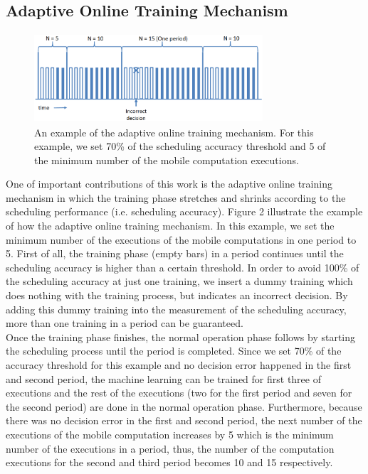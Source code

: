 \documentclass[10pt, conference, compsocconf]{IEEEtran}
\begin{document}
\subsection{Adaptive Online Training Mechanism}
%
\begin{figure}
\centering
\includegraphics[height=3.3cm, width=8.5cm]{Figure/figure2}
\caption{An example of the adaptive online training mechanism. For this
example, we set 70\% of the scheduling accuracy threshold and 5 of the
minimum number of the mobile computation executions.}
\end{figure}
%
One of important contributions of this work is the adaptive online
training mechanism in which the training phase stretches and shrinks
according to the scheduling performance (i.e. scheduling accuracy).
%
Figure 2 illustrate the example of how the adaptive online training
mechanism.
%
In this example, we set the minimum number of the executions of the
mobile computations in one period to 5.
%
First of all, the training phase (empty bars) in a period
continues until the scheduling accuracy is higher than a certain
threshold.
%
In order to avoid 100\% of the scheduling accuracy at just one training,
we insert a dummy training which does nothing with the training process,
but indicates an incorrect decision. 
%
By adding this dummy training into the measurement of the scheduling
accuracy, more than one training in a period can be guaranteed.\\
%
\indent Once the training phase finishes, the normal operation phase
follows by starting the scheduling process until the period is
completed.
%
Since we set 70\% of the accuracy threshold for this example and no
decision error happened in the first and second period, the machine
learning can be trained for first three of executions and the rest of
the executions (two for the first period and seven for the second
period) are done in the normal operation phase. 
%
Furthermore, because there was no decision error in the first and second
period, the next number of the executions of the mobile computation
increases by 5 which is the minimum number of the executions in a
period, thus, the number of the computation executions for the second
and third period becomes 10 and 15 respectively.
\end{document}

